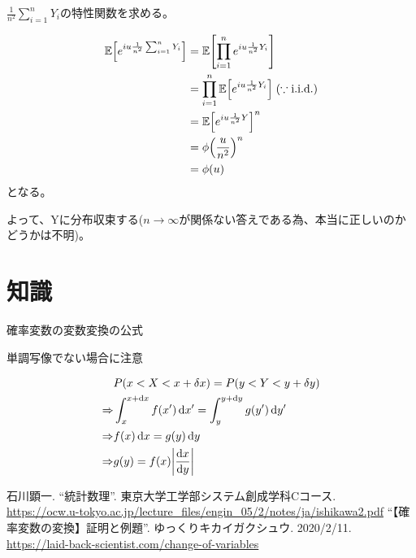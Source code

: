\documentclass[a4paper, 10pt, dvipdfmx]{jlreq}
\begin{document}
$\frac{1}{n^2}\sum_{i=1}^n{Y_i}$の特性関数を求める。

\begin{align*}
  \mathbb{E}\qty[e^{iu\frac{1}{n^2}\sum_{i=1}^n{Y_i}}] & =\mathbb{E}\qty[\prod_{i=1}^{n}e^{iu\frac{1}{n^2}Y_i}]                             \\
                                                       & =\prod_{i=1}^{n}\mathbb{E}\qty[e^{iu\frac{1}{n^2}Y_i}] \; (\because \text{i.i.d.}) \\
                                                       & =\mathbb{E}\qty[e^{iu\frac{1}{n^2}Y}]^n                                            \\
                                                       & =\phi\qty(\frac{u}{n^2})^n                                                         \\
                                                       & =\phi(u)
\end{align*}
となる。

よって、Yに分布収束する($n \to \infty$が関係ない答えである為、本当に正しいのかどうかは不明)。

\section{知識}

確率変数の変数変換の公式\cite{label:1}

単調写像でない場合に注意\cite{label:2}

\begin{align*}
              & P(x<X<x+\delta x)=P(y<Y<y+\delta y)                              \\
  \Rightarrow & \int_{x}^{x+\dd{x}}f(x')\dd{x'}= \int_{y}^{y+\dd{y}}g(y')\dd{y'} \\
  \Rightarrow & f(x)\dd{x}=g(y)\dd{y}                                            \\
  \Rightarrow & g(y)=f(x)\abs{\dv{x}{y}}
\end{align*}

\begin{thebibliography}{9}
  石川顕一. ``統計数理''. 東京大学工学部システム創成学科Cコース. \\\url{https://ocw.u-tokyo.ac.jp/lecture_files/engin_05/2/notes/ja/ishikawa2.pdf}
  ``【確率変数の変換】証明と例題''. ゆっくりキカイガクシュウ. 2020/2/11. \\\url{https://laid-back-scientist.com/change-of-variables}
\end{thebibliography}
\end{document}
